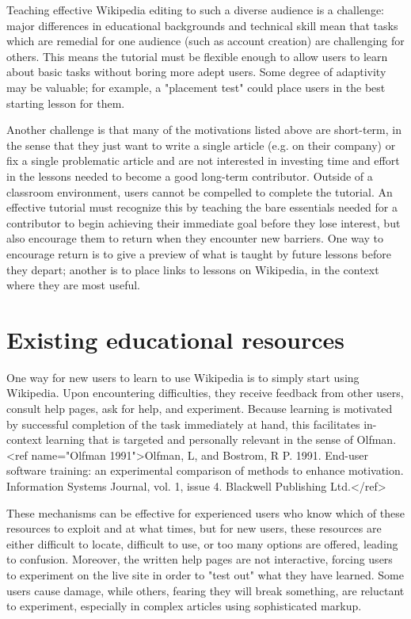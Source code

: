 \documentclass{acm_proc_article-sp}
\begin{document}
Teaching effective Wikipedia editing to such a diverse audience is a challenge: major differences in educational backgrounds and technical skill mean that tasks which are remedial for one audience (such as account creation) are challenging for others. This means the tutorial must be flexible enough to allow users to learn about basic tasks without boring more adept users. Some degree of adaptivity may be valuable; for example, a "placement test" could place users in the best starting lesson for them.

Another challenge is that many of the motivations listed above are short-term, in the sense that they just want to write a single article (e.g. on their company) or fix a single problematic article and are not interested in investing time and effort in the lessons needed to become a good long-term contributor. Outside of a classroom environment, users cannot be compelled to complete the tutorial. An effective tutorial must recognize this by teaching the bare essentials needed for a contributor to begin achieving their immediate goal before they lose interest, but also encourage them to return when they encounter new barriers. One way to encourage return is to give a preview of what is taught by future lessons before they depart; another is to place links to lessons on Wikipedia, in the context where they are most useful.

\section{Existing educational resources}

One way for new users to learn to use Wikipedia is to simply start using Wikipedia. Upon encountering difficulties, they receive feedback from other users, consult help pages, ask for help, and experiment. Because learning is motivated by successful completion of the task immediately at hand, this facilitates in-context learning that is targeted and personally relevant in the sense of Olfman.<ref name="Olfman 1991">Olfman, L, and Bostrom, R P. 1991. End-user software training: an experimental comparison of methods to enhance motivation. Information Systems Journal, vol. 1, issue 4. Blackwell Publishing Ltd.</ref>

These mechanisms can be effective for experienced users who know which of these resources to exploit and at what times, but for new users, these resources are either difficult to locate, difficult to use, or too many options are offered, leading to confusion. Moreover, the written help pages are not interactive, forcing users to experiment on the live site in order to "test out" what they have learned. Some users cause damage, while others, fearing they will break something, are reluctant to experiment, especially in complex articles using sophisticated markup.
\end{document}

